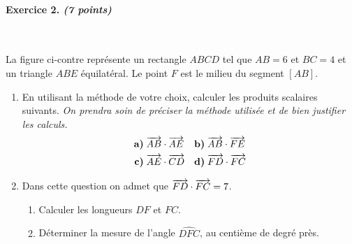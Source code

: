 \documentclass[11pt]{article}
\begin{document}
\paragraph{Exercice 2. \emph{(7 points)}}~\\
\begin{minipage}{.6\textwidth}
  La figure ci-contre représente un rectangle $ABCD$ tel que $AB=6$ et $BC=4$ et
  un triangle $ABE$ équilatéral. Le point $F$ est le milieu du segment $\left[
  AB \right]$.
  \begin{enumerate}
    \item En utilisant la méthode de votre choix, calculer les produits
      scalaires suivants. \emph{On prendra soin de préciser la méthode utilisée
      et de bien justifier les calculs.}
      \begin{align*}
        \textbf{a)}\;& \overrightarrow{AB}\cdot\overrightarrow{AE} &
        \textbf{b)}\;& \overrightarrow{AB}\cdot\overrightarrow{FE} \\
        \textbf{c)}\;& \overrightarrow{AE}\cdot\overrightarrow{CD} &
        \textbf{d)}\;& \overrightarrow{FD}\cdot\overrightarrow{FC}
      \end{align*}
    \item Dans cette question on admet que $\overrightarrow{FD}\cdot\overrightarrow{FC}=7$.
      \begin{enumerate}
        \item Calculer les longueurs $DF$ et $FC$.
        \item Déterminer la mesure de l'angle $\widehat{DFC}$, au centième de
          degré près.
      \end{enumerate}
  \end{enumerate}
\end{minipage}
\begin{minipage}{.4\textwidth}
\begin{center}
\end{center}
\end{minipage}
\end{document}
